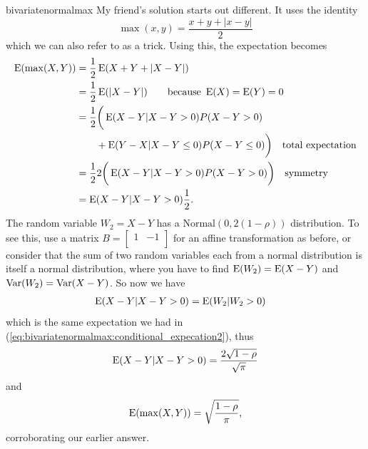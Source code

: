 \begin{answer}{bivariatenormalmax}
My friend's solution starts out different.
It uses the identity
\[
  \max(x,y) = \frac{x + y + |x-y|}{2}
\]
which we can also refer to as a trick.
Using this, the expectation becomes
\begin{align*}
  \operatorname{\mathrm{E}}(\max(X,Y))
  &= \frac{1}{2}\operatorname{\mathrm{E}}(X + Y + |X-Y|) \\
  &= \frac{1}{2}\operatorname{\mathrm{E}}(|X-Y|) \qquad \text{because } \operatorname{\mathrm{E}}(X) = \operatorname{\mathrm{E}}(Y) = 0 \\
  &= \frac{1}{2}
  \bigg(
     \operatorname{\mathrm{E}}(X-Y |X-Y > 0 ) P(X-Y > 0)  \\
  &\qquad + \operatorname{\mathrm{E}}(Y-X |X-Y \leq 0 ) P(X-Y \leq 0)
  \bigg) \quad \text{total expectation} \\
  &= \frac{1}{2} 2
    \bigg(
      \operatorname{\mathrm{E}}(X-Y |X-Y > 0 ) P(X-Y > 0)
    \bigg) \quad \text{symmetry} \\
  &=
    \operatorname{\mathrm{E}}(X-Y |X-Y > 0 ) \frac{1}{2}
\text{.}
\end{align*}
The random variable $W_2 = X-Y$ has a $\text{Normal}(0, 2(1-\rho))$ distribution.
To see this, use a matrix $B=
\begin{bmatrix}
        1 &    -1 \\
\end{bmatrix}
$ for an affine transformation as before, or consider that the sum of two random variables each from a normal distribution is itself a normal distribution, where you have to find
$\operatorname{\mathrm{E}}(W_2) = \operatorname{\mathrm{E}}(X-Y)$
and
$\operatorname{\mathrm{Var}}(W_2) = \operatorname{\mathrm{Var}}(X-Y)$.
So now we have
\begin{align*}
\operatorname{\mathrm{E}}(X-Y|X-Y > 0) &=  \operatorname{\mathrm{E}}(W_2|W_2 > 0)
\end{align*}
which is the same expectation we had in (\ref{eq:bivariatenormalmax:conditional_expecation2}), thus
\begin{align*}
\operatorname{\mathrm{E}}(X-Y|X-Y > 0) =
 \frac{ 2 \sqrt{ 1- \rho}  }{ \sqrt{ \pi} }
\end{align*}
and
\[
\operatorname{\mathrm{E}}(\max(X, Y)) = \sqrt{\frac{  1- \rho  }{  \pi }}
\text{,}
\]
corroborating our earlier answer.

\end{answer}

